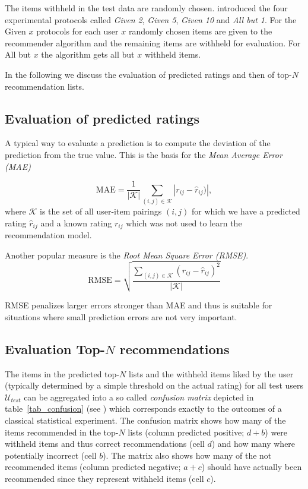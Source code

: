 \documentclass[nojss]{jss}
\newcommand{\set}[1]{\mathcal{#1}}
\begin{document}
The items withheld in the test data are randomly chosen.
\cite{recommender:Breese:1998} introduced the four experimental protocols
called {\em Given 2}, {\em Given 5}, {\em Given 10} and {\em All but 1}. For
the Given $x$ protocols for each user $x$ randomly chosen items are given to
the recommender algorithm and the remaining items are withheld for evaluation.
For All but $x$ the algorithm gets all but $x$ withheld items.

In the following we discuss the evaluation of predicted ratings
and then of top-$N$ recommendation lists.

\subsection{Evaluation of predicted ratings}

A typical way to evaluate a prediction is to compute
the deviation of the prediction from the true value.
This is the basis for the \emph{Mean
Average Error (MAE)}

\begin{equation}
\mathrm{MAE} = \frac{1}{|\set{K}|} \sum_{(i,j)\in \set{K}} |r_{ij} - \hat{r}_{ij})|,
\end{equation}
where $\set{K}$ is the set of all user-item pairings  $(i,j)$
for which we have a predicted rating $\hat{r}_{ij}$ and a known rating
$r_{ij}$ which was not used to learn the recommendation model.

Another popular measure is the \emph{Root Mean Square Error (RMSE)}.
\begin{equation}
\mathrm{RMSE} = \sqrt{\frac{\sum_{(i,j)\in \set{K}} (r_{ij} - \hat{r}_{ij})^2}{|\set{K}|}}
\end{equation}

RMSE penalizes larger errors stronger than MAE and thus is suitable for
situations where small prediction errors are not very important.

\subsection{Evaluation Top-$N$ recommendations}

The items in the predicted top-$N$ lists and the
withheld items  liked by the user (typically determined by a simple threshold
on the actual rating) for all test users $\set{U}_{test}$
can be aggregated into a so called {\em confusion matrix} depicted in
table~\ref{tab_confusion} (see \cite{recommender:Kohavi:1998})
which corresponds
exactly to the outcomes of a classical statistical experiment.
The confusion matrix shows how many of the items recommended in
the top-$N$ lists (column predicted positive; $d+b$)
were withheld items and thus correct recommendations
(cell $d$) and how many where potentially incorrect (cell $b$).
The matrix also shows
how many of the not recommended items
(column predicted negative; $a+c$)
should have actually been recommended since they represent withheld items (cell $c$).
\end{document}
